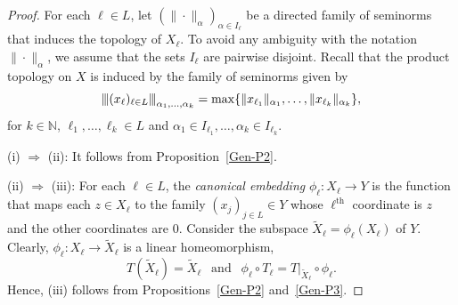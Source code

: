 \documentclass[12pt]{amsart}
\theoremstyle{theorem}
\theoremstyle{definition}
\theoremstyle{remark} \theoremstyle{question} \theoremstyle{example}
\newcommand{\N}{\mathbb{N}}   %
\newcommand{\vertiii}[1]{{\left\vert\kern-0.25ex\left\vert\kern-0.25ex\left\vert #1 
    \right\vert\kern-0.25ex\right\vert\kern-0.25ex\right\vert}}
\newcommand{\wt} {\widetilde}    %
\begin{document}
\begin{proof}
For each $\ell \in L$, let $(\|\cdot\|_\alpha)_{\alpha \in I_\ell}$ be a directed family of seminorms that induces the topology of $X_\ell$.
To avoid any ambiguity with the notation $\|\cdot\|_\alpha$, we assume that the sets $I_\ell$ are pairwise disjoint.
Recall that the product topology on $X$ is induced by the family of seminorms given by
\[
\vertiii{(x_\ell)_{\ell \in L}}_{\alpha_1,\ldots,\alpha_k} = \max\{\|x_{\ell_1}\|_{\alpha_1},\ldots,\|x_{\ell_k}\|_{\alpha_k}\},
\]
for $k \in \N$, $\ell_1,\ldots,\ell_k \in L$ and $\alpha_1 \in I_{\ell_1},\ldots,\alpha_k \in I_{\ell_k}$.

\smallskip\noindent
(i) $\Rightarrow$ (ii): It follows from Proposition~\ref{Gen-P2}.

\smallskip\noindent
(ii) $\Rightarrow$ (iii): For each $\ell \in L$, the {\em canonical embedding} $\phi_\ell : X_\ell \to Y$ is the function that maps each 
$z \in X_\ell$ to the family $(x_j)_{j \in L} \in Y$ whose $\ell^\text{th}$ coordinate is $z$ and the other coordinates are $0$.
Consider the subspace $\wt{X}_\ell = \phi_\ell(X_\ell)$ of $Y$.
Clearly, $\phi_\ell : X_\ell \to \wt{X}_\ell$ is a linear homeomorphism, 
\[
T(\wt{X}_\ell) = \wt{X}_\ell \ \ \text{ and } \ \ \phi_\ell \circ T_\ell = T|_{\wt{X}_\ell} \circ \phi_\ell.
\]
Hence, (iii) follows from Propositions~\ref{Gen-P2} and~\ref{Gen-P3}.


\end{proof}
\end{document}
